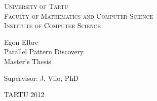 \begin{titlepage}
\begin{center}

{\scshape
    University of Tartu                  \\[2mm]
    Faculty of Mathematics and Computer Science   \\[3mm]
    Institute of Computer Science
}

  {\Large Egon Elbre } \\[5mm]
  {\Huge  Parallel Pattern Discovery } \\[5mm]
  {\large Master's Thesis }

\begin{flushright}
    {\Large Supervisor: J. Vilo, PhD }
\end{flushright}


{\large TARTU 2012 }

\end{center}
\end{titlepage}

